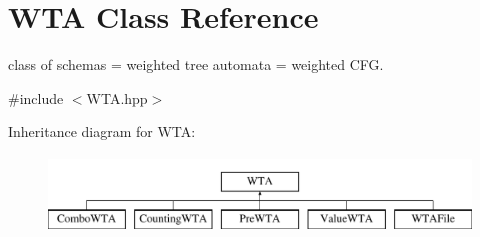 \hypertarget{classWTA}{}\section{W\+TA Class Reference}
\label{classWTA}


class of schemas = weighted tree automata = weighted C\+FG.  




{\ttfamily \#include $<$W\+T\+A.\+hpp$>$}

Inheritance diagram for W\+TA\+:\begin{figure}[H]
\begin{center}
\leavevmode
\includegraphics[height=2.000000cm]{classWTA}
\end{center}
\end{figure}
